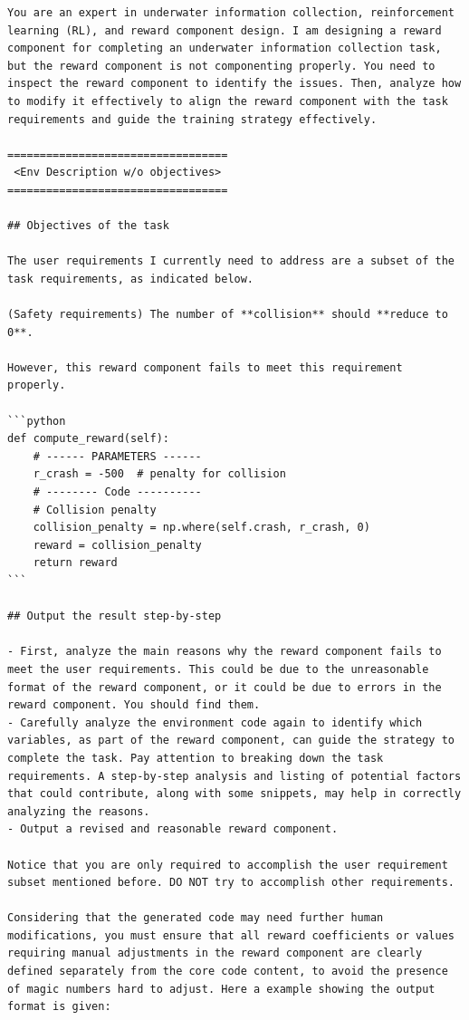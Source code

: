 \documentclass{article}
\begin{document}
\begin{verbatim}
You are an expert in underwater information collection, reinforcement learning (RL), and reward component design. I am designing a reward component for completing an underwater information collection task, but the reward component is not componenting properly. You need to inspect the reward component to identify the issues. Then, analyze how to modify it effectively to align the reward component with the task requirements and guide the training strategy effectively.

==================================
 <Env Description w/o objectives>
==================================

## Objectives of the task

The user requirements I currently need to address are a subset of the task requirements, as indicated below.

(Safety requirements) The number of **collision** should **reduce to 0**.

However, this reward component fails to meet this requirement properly. 

```python
def compute_reward(self):
    # ------ PARAMETERS ------
    r_crash = -500  # penalty for collision
    # -------- Code ----------
    # Collision penalty
    collision_penalty = np.where(self.crash, r_crash, 0)
    reward = collision_penalty
    return reward
```

## Output the result step-by-step

- First, analyze the main reasons why the reward component fails to meet the user requirements. This could be due to the unreasonable format of the reward component, or it could be due to errors in the reward component. You should find them.
- Carefully analyze the environment code again to identify which variables, as part of the reward component, can guide the strategy to complete the task. Pay attention to breaking down the task requirements. A step-by-step analysis and listing of potential factors that could contribute, along with some snippets, may help in correctly analyzing the reasons.
- Output a revised and reasonable reward component.

Notice that you are only required to accomplish the user requirement subset mentioned before. DO NOT try to accomplish other requirements.

Considering that the generated code may need further human modifications, you must ensure that all reward coefficients or values requiring manual adjustments in the reward component are clearly defined separately from the core code content, to avoid the presence of magic numbers hard to adjust. Here a example showing the output format is given:


\end{verbatim}
\end{document}
